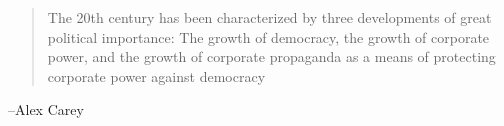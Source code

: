 \documentclass{exam}
\begin{document}
  \else
    \vspace{7 cm}
    \begin{quote}
      \begin{em}
        The 20th century has been characterized by three developments of great political importance: The growth of
        democracy, the growth of corporate power, and the growth of corporate propaganda as a means of protecting
        corporate power against democracy
      \end{em}
    \end{quote}
    \hspace{1 cm} --Alex Carey
  \fi
\end{document}

